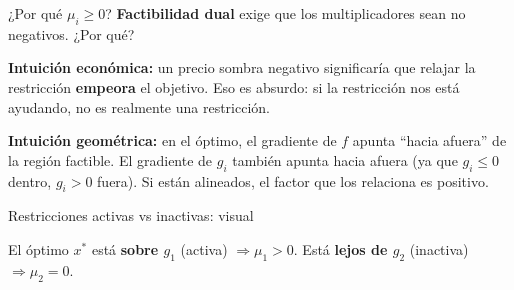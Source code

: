 \documentclass{beamer}
\begin{document}
\begin{frame}{¿Por qué $\mu_i \geq 0$?}
    \small
    \textbf{Factibilidad dual} exige que los multiplicadores sean no negativos. ¿Por qué?

    \vspace{0.5em}

    \textbf{Intuición económica:} un precio sombra negativo significaría que relajar la restricción \textbf{empeora} el objetivo. Eso es absurdo: si la restricción nos está ayudando, no es realmente una restricción.

    \vspace{0.5em}

    \textbf{Intuición geométrica:} en el óptimo, el gradiente de $f$ apunta ``hacia afuera'' de la región factible. El gradiente de $g_i$ también apunta hacia afuera (ya que $g_i \leq 0$ dentro, $g_i > 0$ fuera). Si están alineados, el factor que los relaciona es positivo.
\end{frame}

\begin{frame}{Restricciones activas vs inactivas: visual}
    \small
    \begin{center}
    \end{center}

    \vspace{0.3em}

    El óptimo $x^*$ está \textbf{sobre $g_1$} (activa) $\Rightarrow \mu_1 > 0$. Está \textbf{lejos de $g_2$} (inactiva) $\Rightarrow \mu_2 = 0$.
\end{frame}
\end{document}
